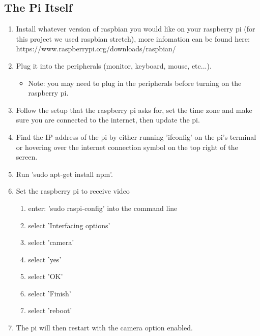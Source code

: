 \documentclass[onecolumn, draftclsnofoot,10pt, compsoc]{IEEEtran}
\begin{document}
\subsection{The Pi Itself}
\begin{enumerate}

\item Install whatever version of raspbian you would like on your raspberry pi (for this project we used raspbian stretch), more infomation can be found here:  https://www.raspberrypi.org/downloads/raspbian/
\item Plug it into the peripherals (monitor, keyboard, mouse, etc...).
\begin{itemize}
    \item Note: you may need to plug in the peripherals before turning on the raspberry pi.
\end{itemize}
\item Follow the setup that the raspberry pi asks for, set the time zone and make sure you are connected to the internet, then update the pi.
\item Find the IP address of the pi by either running 'ifconfig' on the pi's terminal or hovering over the internet connection symbol on the top right of the screen.
\item Run 'sudo apt-get install npm'.
\item Set the raspberry pi to receive video
\begin{enumerate}

    \item enter: 'sudo raspi-config' into the command line
    \item select 'Interfacing options'
    \item select 'camera'
    \item select 'yes'
    \item select 'OK'
    \item select 'Finish'
    \item select 'reboot' 
    \end{enumerate}

\item The pi will then restart with the camera option enabled. 
\end{enumerate}
\end{document}
